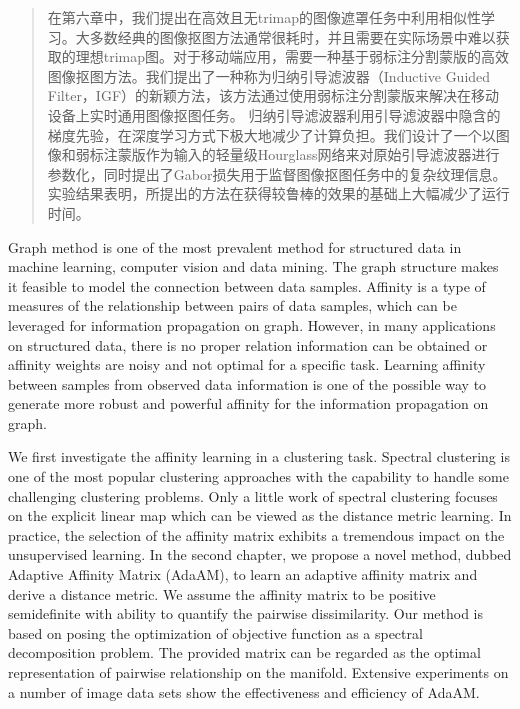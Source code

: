 \begin{abstract}
  在第六章中，我们提出在高效且无trimap的图像遮罩任务中利用相似性学习。大多数经典的图像抠图方法通常很耗时，并且需要在实际场景中难以获取的理想trimap图。对于移动端应用，需要一种基于弱标注分割蒙版的高效图像抠图方法。我们提出了一种称为归纳引导滤波器（Inductive Guided Filter，IGF）的新颖方法，该方法通过使用弱标注分割蒙版来解决在移动设备上实时通用图像抠图任务。
  归纳引导滤波器利用引导滤波器中隐含的梯度先验，在深度学习方式下极大地减少了计算负担。我们设计了一个以图像和弱标注蒙版作为输入的轻量级Hourglass网络来对原始引导滤波器进行参数化，同时提出了Gabor损失用于监督图像抠图任务中的复杂纹理信息。
  实验结果表明，所提出的方法在获得较鲁棒的效果的基础上大幅减少了运行时间。
\end{abstract}

\begin{enabstract}
  Graph method is one of the most prevalent method for structured data in machine learning, computer vision and data mining. The graph structure makes it feasible to model the connection between data samples. Affinity is a type of  measures of the relationship between pairs of data samples, which can be leveraged for information propagation on graph. However, in many applications on structured data, there is no proper relation information can be obtained or affinity weights are noisy and not optimal for a specific task. Learning affinity between samples from observed data information is one of the possible way to generate more robust and powerful affinity for the information propagation on graph.

  We first investigate the affinity learning in a clustering task. Spectral clustering is one of the most popular clustering approaches with the capability to handle some challenging clustering problems. Only a little work of spectral clustering focuses on the explicit linear map which can be viewed as the distance metric learning. In practice, the selection of the affinity matrix exhibits a tremendous impact on the unsupervised learning. In the second chapter, we propose a novel method, dubbed Adaptive Affinity Matrix (AdaAM), to learn an adaptive affinity matrix and derive a distance metric. We assume the affinity matrix to be positive semidefinite with ability to quantify the pairwise dissimilarity. Our method is based on posing the optimization of objective function as a spectral decomposition problem. The provided matrix can be regarded as the optimal representation of pairwise relationship on the manifold. Extensive experiments on a number of image data sets show the effectiveness and efficiency of AdaAM.


\end{enabstract}
